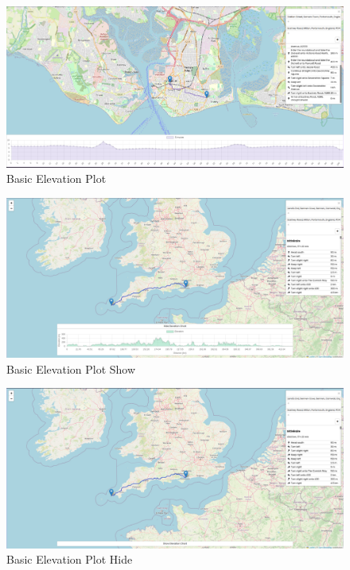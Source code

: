 \begin{figure}[!ht]
    \centering
    \includegraphics[width=425px]{figures/Progress Images/Iteration-1/SR28/Basic Elevation Plot.png}
    \caption{Basic Elevation Plot}
    \label{fig:basic-elev-plot}
\end{figure}

\begin{figure}[!ht]
    \centering
    \includegraphics[width=425px]{figures/Progress Images/Iteration-1/SR28/Basic Elevation Plot Show Functionality.png}
    \caption{Basic Elevation Plot Show}
    \label{fig:basic-elev-plot-show}
\end{figure}

\begin{figure}[!ht]
    \centering
    \includegraphics[width=425px]{figures/Progress Images/Iteration-1/SR28/Basic Elevation Plot Hide Functionality.png}
    \caption{Basic Elevation Plot Hide}
    \label{fig:basic-elev-plot-hide}
\end{figure}
